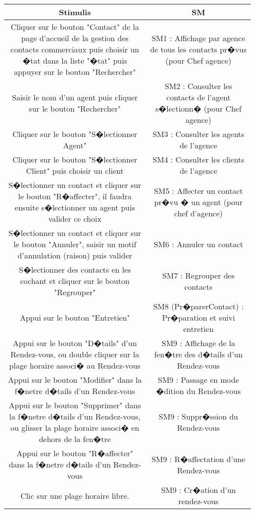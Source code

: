 \begin{tabular}{|c|c|}
\hline
Stimulis 
& SM \\
\hline
Cliquer sur le bouton "Contact" de la page d'accueil de la gestion des contacts commerciaux puis choisir un �tat dans la liste "�tat" puis appuyer sur le bouton "Rechercher"
& SM1 : Affichage par agence de tous les contacts pr�vus (pour Chef agence)\\
\hline
Saisir le nom d'un agent puis cliquer sur le bouton "Rechercher"
& SM2 : Consulter les contacts de l'agent s�lectionn� (pour Chef agence)\\
\hline
Cliquer sur le bouton "S�lectionner Agent"
& SM3 : Consulter les agents de l'agence\\
\hline
Cliquer sur le bouton "S�lectionner Client" puis choisir un client
& SM4 : Consulter les clients de l'agence\\
\hline
S�lectionner un contact et cliquer sur le bouton "R�affecter", il faudra ensuite s�lectionner un agent puis valider ce choix
& SM5 : Affecter un contact pr�vu � un agent (pour chef d'agence)\\
\hline
S�lectionner un contact et cliquer sur le bouton "Annuler", saisir un motif d'annulation (raison) puis valider
& SM6 : Annuler un contact\\
\hline
S�lectionner des contacts en les cochant et cliquer sur le bouton "Regrouper"
& SM7 : Regrouper des contacts\\
\hline
Appui sur le bouton "Entretien"
& SM8 (Pr�parerContact) : Pr�paration et suivi entretien\\
\hline
Appui sur le bouton "D�tails" d'un Rendez-vous, ou double cliquer sur la plage horaire associ� au Rendez-vous
& SM9 : Affichage de la fen�tre des d�tails d'un Rendez-vous\\
\hline
Appui sur le bouton "Modifier" dans la f�netre d�tails d'un Rendez-vous
& SM9 : Passage en mode �dition du Rendez-vous\\
\hline
Appui sur le bouton "Supprimer" dans la f�netre d�tails d'un Rendez-vous, ou glisser la plage horaire associ� en dehors de la fen�tre
& SM9 : Suppr�ssion du Rendez-vous\\
\hline
Appui sur le bouton "R�affecter" dans la f�netre d�tails d'un Rendez-vous
& SM9 : R�affectation d'une Rendez-vous\\
\hline
Clic sur une plage horaire libre.
& SM9 : Cr�ation d'un rendez-vous\\
\hline
\end{tabular}


